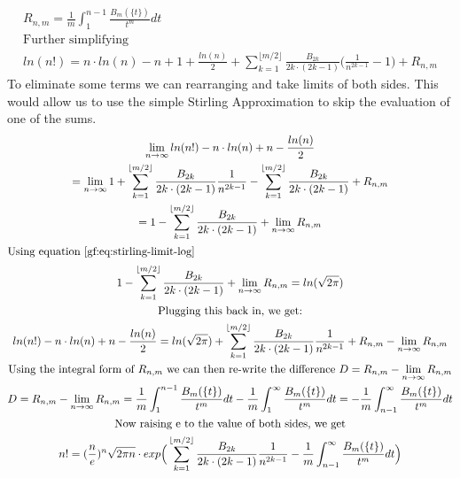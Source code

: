 \documentclass[a4paper]{article}
\begin{document}
\begin{theorem}
\begin{gather*}
            \\
            R_{n,m} = \frac{1}{m} \int_{1}^{n-1} \frac{B_m(\{t\})}{t^m}  dt
            \\
            \text{Further simplifying}
            \\
            ln(n!) = n \cdot ln(n) - n + 1 +
            \frac{ln(n)}{2}
            + \sum_{k=1}^{\lfloor m/2 \rfloor} \frac{B_{2k}}{2k \cdot (2k-1)} \Big(\frac{1}{n^{2k-1}} - 1\Big) + R_{n,m}
        \end{gather*}
        To eliminate some terms we can rearranging and take limits of both sides.
        This would allow us to use the simple Stirling Approximation to skip the evaluation of one of the sums.
        \begin{gather*}
            \lim_{n \to \infty}
            ln(n!)  - n \cdot ln(n) + n - \frac{ln(n)}{2}
            \\
            = \lim_{n \to \infty}
            1 + \sum_{k=1}^{\lfloor m/2 \rfloor} \frac{B_{2k}}{2k \cdot (2k-1)} \frac{1}{n^{2k-1}}
            - \sum_{k=1}^{\lfloor m/2 \rfloor} \frac{B_{2k}}{2k \cdot (2k-1)}
            + R_{n,m}
            \\
            = 1 - \sum_{k=1}^{\lfloor m/2 \rfloor} \frac{B_{2k}}{2k \cdot (2k-1)}
            + \lim_{n \to \infty} R_{n,m}
            \\
            \intertext{Using equation~\ref{gf:eq:stirling-limit-log}}
            1 - \sum_{k=1}^{\lfloor m/2 \rfloor} \frac{B_{2k}}{2k \cdot (2k-1)} + \lim_{n \to \infty} R_{n,m}
            = ln(\sqrt{2\pi})
            \\
            \text{Plugging this back in, we get:}
            \\
            ln(n!)  - n \cdot ln(n) + n - \frac{ln(n)}{2}
            = ln(\sqrt{2\pi}) + \sum_{k=1}^{\lfloor m/2 \rfloor} \frac{B_{2k}}{2k \cdot (2k-1)} \frac{1}{n^{2k-1}}
            + R_{n,m} - \lim_{n \to \infty} R_{n,m}
            \\
            \text{Using the integral form of $R_{n,m}$ we can then re-write the difference }
            D = R_{n,m} - \lim_{n \to \infty} R_{n,m}
            \\
            D = R_{n,m} - \lim_{n \to \infty} R_{n,m}
            =
            \frac{1}{m} \int_{1}^{n-1} \frac{B_m(\{t\})}{t^m}  dt
            -
            \frac{1}{m} \int_{1}^{\infty} \frac{B_m(\{t\})}{t^m}  dt
            =
            - \frac{1}{m} \int_{n-1}^{\infty} \frac{B_m(\{t\})}{t^m}  dt
            \\
            \text{Now raising e to the value of both sides, we get}
            \\
            n! = (\frac{n}{e})^n \sqrt{2\pi n} \cdot
            exp \Big( \sum_{k=1}^{\lfloor m/2 \rfloor} \frac{B_{2k}}{2k \cdot (2k-1)} \frac{1}{n^{2k-1}} - \frac{1}{m} \int_{n-1}^{\infty} \frac{B_m(\{t\})}{t^m}  dt \Big)
        \end{gather*}
    \end{theorem}
\end{document}
